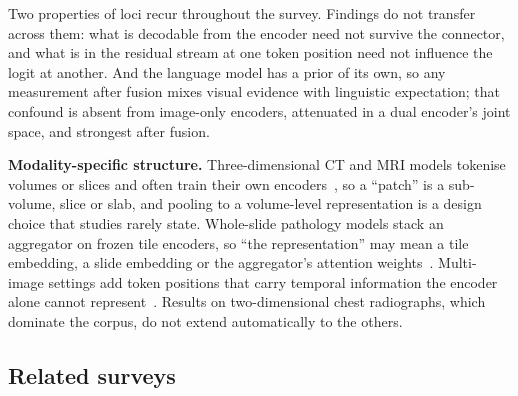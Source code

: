 Two properties of loci recur throughout the survey. Findings do not transfer across them: what is
decodable from the encoder need not survive the connector, and what is in the residual stream at one
token position need not influence the logit at another. And the language model has a prior of its own,
so any measurement after fusion mixes visual evidence with linguistic expectation; that confound is
absent from image-only encoders, attenuated in a dual encoder's joint space, and strongest after fusion.

\textbf{Modality-specific structure.} Three-dimensional CT and MRI models tokenise volumes or slices
and often train their own encoders~\cite{hamamci2024ctrate,blankemeier2024merlin}, so a ``patch'' is a
sub-volume, slice or slab, and pooling to a volume-level representation is a design choice that studies
rarely state. Whole-slide pathology models stack an aggregator on frozen tile encoders, so ``the
representation'' may mean a tile embedding, a slide embedding or the aggregator's attention
weights~\cite{chen2024generalpurpose,xu2024wholeslide}. Multi-image settings add token positions that
carry temporal information the encoder alone cannot represent~\cite{bannur2024maira2}. Results on
two-dimensional chest radiographs, which dominate the corpus, do not extend automatically to the others.

\subsection{Related surveys}
\label{sec:related}


